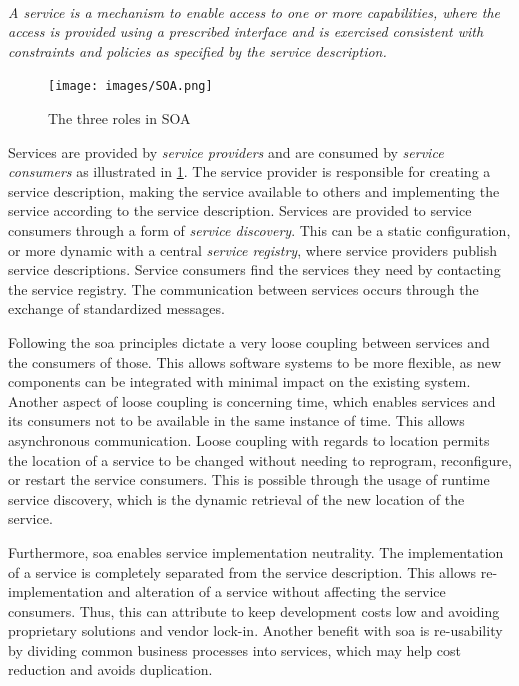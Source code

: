 \paragraph{}
\textit{
A service is a mechanism to enable access to one or more capabilities, where the
access is  provided using a prescribed interface and is exercised consistent
with constraints and policies as  specified by the service description.
}

\begin{figure}[h]
\texttt{[image: images/SOA.png]}
\caption{The three roles in SOA}
\label{figure-soa-roles}
\end{figure}

Services are provided by \textit{service providers} and are consumed by
\textit{service consumers} as illustrated in \cref{figure-soa-roles}. The
service provider is responsible for creating a service description, making the
service available to others and implementing the service according to the
service description. Services are provided to service consumers through a form
of \textit{service discovery}. This can be a static configuration, or more
dynamic with a central \textit{service registry}, where service providers
publish service descriptions. Service consumers find the services they need by
contacting the service registry. The communication between services occurs
through the exchange of standardized messages.

Following the \gls{soa} principles dictate a very loose coupling between
services and the consumers of those. This allows software systems to be more
flexible, as new components can be integrated with minimal impact on the
existing system. Another aspect of loose coupling is concerning time, which
enables services and its consumers not to be available in the same instance of
time. This allows asynchronous communication. Loose coupling with regards to
location permits the location of a service to be changed without needing to
reprogram, reconfigure, or restart the service consumers. This is possible
through the usage of runtime service discovery, which is the dynamic retrieval
of the new location of the service.

Furthermore, \gls{soa} enables service implementation neutrality. The
implementation of a service is completely separated from the service
description. This allows re-implementation and alteration of a service without
affecting the service consumers. Thus, this can attribute to keep development
costs low and avoiding proprietary solutions and vendor lock-in. Another
benefit with \gls{soa} is re-usability by dividing common business processes
into services, which may help cost reduction and avoids duplication.

